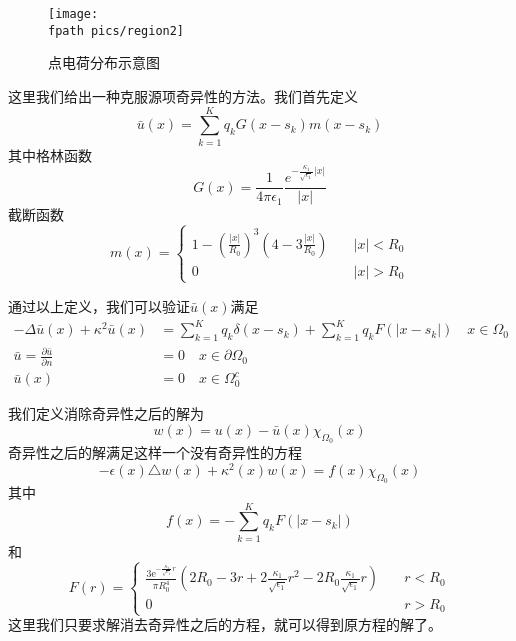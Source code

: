 \begin{figure}[htbp]
\centering
\texttt{[image: \\fpath pics/region2]}
\caption{点电荷分布示意图}
\label{region2}
\end{figure}

这里我们给出一种克服源项奇异性的方法。我们首先定义
\begin{equation}
\bar{u}(x) = \sum_{k=1}^{K} q_k G(x - s_k) m(x - s_k)
\end{equation}
其中格林函数
\begin{equation}
G(x) = \frac{1}{4 \pi \epsilon_1} \frac{e^{-\frac{\kappa_1}{\sqrt{\epsilon_1}} |x|}}{|x|}
\end{equation}
截断函数
\begin{equation}
m(x) = \left\{
\begin{split}
1 - \left(\frac{|x|}{R_0}\right)^3 \left(4 - 3 \frac{|x|}{R_0} \right) &\quad |x| < R_0 \\
0 &\quad |x| > R_0
\end{split}
\right.
\end{equation}

通过以上定义，我们可以验证$\bar{u}(x)$满足
\begin{equation}
\begin{split}
-\Delta \bar{u}(x) + \kappa^2 \bar{u}(x) & = \sum_{k=1}^{K} q_k \delta(x - s_k) + \sum_{k=1}^{K} q_k F(|x - s_k|) \quad x \in \Omega_0 \\
\bar u= \frac{\partial \bar u}{\partial n} & = 0 \quad x \in \partial \Omega_0 \\
\bar{u}(x) & = 0 \quad x \in \Omega_0^c
\end{split}
\end{equation}

我们定义消除奇异性之后的解为
\begin{equation}
w(x) = u(x) - \bar{u}(x)  \chi_{\Omega_0}(x)
\end{equation}
奇异性之后的解满足这样一个没有奇异性的方程
\begin{equation}
\label{eqws}
- \epsilon(x) \triangle w(x) + \kappa^2(x) w(x)  = f(x) \chi_{\Omega_0}(x)
\end{equation}
其中
\begin{equation}
f(x) = -\sum_{k=1}^{K} q_k F(|x - s_k|)
\end{equation}
和
\begin{equation}
F(r) = \left\{
\begin{split}
\frac{3 \mathrm{e}^{-\frac{\kappa_1}{\sqrt{\epsilon_1}} r}}{\pi R_0^4} (2 R_0 - 3 r + 2 \frac{\kappa_1}{\sqrt{\epsilon_1}} r^2 - 2 R_0 \frac{\kappa_1}{\sqrt{\epsilon_1}} r) & \quad r < R_0\\
0 & \quad r > R_0
\end{split}
\right.
\end{equation}
这里我们只要求解消去奇异性之后的方程，就可以得到原方程的解了。


